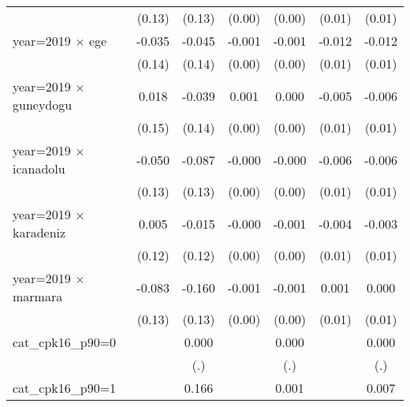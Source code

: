 {\begin{tabular}{l*{6}{c}}
                    &      (0.13)         &      (0.13)         &      (0.00)         &      (0.00)         &      (0.01)         &      (0.01)         \\
year=2019 $\times$ ege&      -0.035         &      -0.045         &      -0.001         &      -0.001         &      -0.012         &      -0.012         \\
                    &      (0.14)         &      (0.14)         &      (0.00)         &      (0.00)         &      (0.01)         &      (0.01)         \\
year=2019 $\times$ guneydogu&       0.018         &      -0.039         &       0.001         &       0.000         &      -0.005         &      -0.006         \\
                    &      (0.15)         &      (0.14)         &      (0.00)         &      (0.00)         &      (0.01)         &      (0.01)         \\
year=2019 $\times$ icanadolu&      -0.050         &      -0.087         &      -0.000         &      -0.000         &      -0.006         &      -0.006         \\
                    &      (0.13)         &      (0.13)         &      (0.00)         &      (0.00)         &      (0.01)         &      (0.01)         \\
year=2019 $\times$ karadeniz&       0.005         &      -0.015         &      -0.000         &      -0.001         &      -0.004         &      -0.003         \\
                    &      (0.12)         &      (0.12)         &      (0.00)         &      (0.00)         &      (0.01)         &      (0.01)         \\
year=2019 $\times$ marmara&      -0.083         &      -0.160         &      -0.001         &      -0.001         &       0.001         &       0.000         \\
                    &      (0.13)         &      (0.13)         &      (0.00)         &      (0.00)         &      (0.01)         &      (0.01)         \\
cat\_cpk16\_p90=0     &                     &       0.000         &                     &       0.000         &                     &       0.000         \\
                    &                     &         (.)         &                     &         (.)         &                     &         (.)         \\
cat\_cpk16\_p90=1     &                     &       0.166\sym{***}&                     &       0.001\sym{***}&                     &       0.007\sym{***}\\

\end{tabular}}
